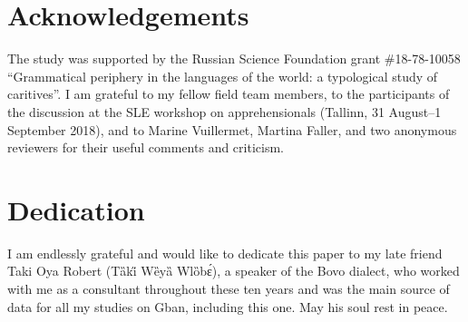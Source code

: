 \documentclass[output=paper,colorlinks,citecolor=brown
]{langscibook}
\begin{document}
\section*{Acknowledgements}

The study was supported by the Russian Science Foundation grant \#18-78-10058 ``Grammatical periphery in the languages of the world: a typological study of caritives''. I am grateful to my fellow field team members, to the participants of the discussion at the SLE workshop on apprehensionals (Tallinn, 31 August--1 September 2018), and to Marine Vuillermet, Martina Faller, and two anonymous reviewers for their useful comments and criticism.

\section*{Dedication}

I am endlessly grateful and would like to dedicate this paper to my late friend Taki Oya Robert (Tȁki̋ Wȅyȁ Wlȍbɛ́), a speaker of the Bovo dialect, who worked with me as a consultant throughout these ten years and was the main source of data for all my studies on Gban, including this one. May his soul rest in peace.


\printbibliography[heading=subbibliography,notkeyword=this]
\end{document}
